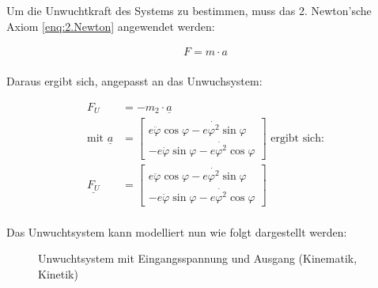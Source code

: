 Um die Unwuchtkraft des Systems zu bestimmen, muss das 2. Newton'sche Axiom \ref{enq:2.Newton} angewendet werden:

\begin{equation}
	\begin{aligned}
		F = m \cdot a \\
		\label{enq:2.Newton}
	\end{aligned}
\end{equation}

Daraus ergibt sich, angepasst an das Unwuchsystem:

\begin{equation}
\begin{aligned}
	F_U &= -m_2 \cdot \underline{a} \\
	\text{mit } \underline{a} &= \begin{bmatrix} e \ddot{\varphi} \cos \varphi  - e \dot{\varphi^2} \sin\varphi \\
	-e \ddot{\varphi} \sin \varphi  - e \dot{\varphi^2} \cos \varphi \end{bmatrix} \text{ ergibt sich:} \\
	\underline{F_U} &= \begin{bmatrix} e \ddot{\varphi} \cos \varphi  - e \dot{\varphi^2} \sin\varphi \\
	-e \ddot{\varphi} \sin \varphi  - e \dot{\varphi^2} \cos \varphi \end{bmatrix} \\
	\label{enq:Unwuchtkraft}
\end{aligned}
\end{equation}

Das Unwuchtsystem kann modelliert nun wie folgt dargestellt werden:

\begin{figure}[hbt]
	
	\caption{Unwuchtsystem mit Eingangsspannung und Ausgang (Kinematik, Kinetik)}
	\label{fig:Unwuchtsystem}
	
\end{figure}